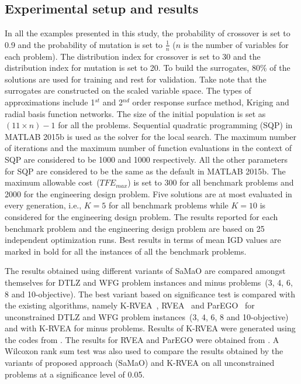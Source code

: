 \documentclass[twocolumn,10pt]{asme2ej}
\begin{document}
\subsection{Experimental setup and results}
\label{subsec:KHTsubsec:2}
In all the examples presented in this study, the probability of crossover is set to 0.9 and the probability of mutation is set to $\frac{1}{n}$ ($n$ is the number of variables for each problem). The distribution index for crossover is set to 30 and the distribution index for mutation is set to 20. To build the surrogates, 80\% of the solutions are used for training and rest for validation. Take note that the surrogates are constructed on the scaled variable space. The types of approximations include 1$^{st}$ and 2$^{nd}$ order response surface method, Kriging and radial basis function networks. The size of the initial population is set as $(11\times n)-1$ for all the problems. Sequential quadratic programming (SQP) in MATLAB 2015b is used as the solver for the local search. The maximum number of iterations and the maximum number of function evaluations in the context of SQP are considered to be 1000 and 1000 respectively. All the other parameters for SQP are considered to be the same as the default in MATLAB 2015b. The maximum allowable cost~($TFE_{max}$) is set to 300 for all benchmark problems and 2000 for the engineering design problem. Five solutions are at most evaluated in every generation, i.e., $K = 5$ for all benchmark problems while $K = 10$ is considered for the engineering design problem. The results reported for each benchmark problem and the engineering design problem are based on 25 independent optimization runs. Best results in terms of mean IGD values are marked in bold for all the instances of all the benchmark problems.

The results obtained using different variants of SaMaO are compared amongst themselves for DTLZ and WFG problem instances and minus problems~(3, 4, 6, 8 and 10-objective). The best variant based on significance test is compared with the existing algorithms, namely K-RVEA~\cite{KHTchugh2016krvea}, RVEA~\cite{KHTCheng2016many} and ParEGO~\cite{KHTknowles2006pha} for unconstrained DTLZ and WFG problem instances~(3, 4, 6, 8 and 10-objective) and with K-RVEA for minus problems. Results of K-RVEA were generated using the codes from \cite{KHTplatemo}. The results for RVEA and ParEGO were obtained from \cite{KHTchugh2016krvea}. A Wilcoxon rank sum test was also used to compare the results obtained by the variants of proposed approach (SaMaO) and K-RVEA on all unconstrained problems at a significance level of 0.05. 
\end{document}
